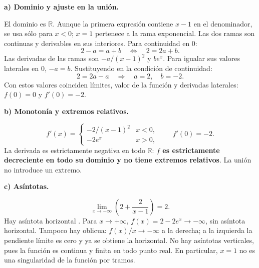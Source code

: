 \textbf{a) Dominio y ajuste en la unión.}\par\nopagebreak[4]
El dominio es $\mathbb R$. Aunque la primera expresión contiene $x-1$ en el denominador, se usa sólo para $x<0$; $x=1$ pertenece a la rama exponencial. Las dos ramas son continuas y derivables en sus interiores.
Para continuidad en $0$:
\[
2-a=a+b\quad\Longleftrightarrow\quad2=2a+b.
\]
Las derivadas de las ramas son $-a/(x-1)^2$ y $be^x$. Para igualar sus valores laterales en $0$, $-a=b$. Sustituyendo en la condición de continuidad:
\[
2=2a-a\quad\Longrightarrow\quad\boxed{a=2,\quad b=-2.}
\]
Con estos valores coinciden límites, valor de la función y derivadas laterales: $f(0)=0$ y $f'(0)=-2$.

\textbf{b) Monotonía y extremos relativos.}\par\nopagebreak[4]
\[
f'(x)=\begin{cases}-2/(x-1)^2&x<0,\\-2e^x&x>0,\end{cases}
\qquad f'(0)=-2.
\]
La derivada es estrictamente negativa en todo $\mathbb R$: \textbf{$f$ es estrictamente decreciente en todo su dominio y no tiene extremos relativos}. La unión no introduce un extremo.

\textbf{c) Asíntotas.}\par\nopagebreak[4]
\[
\lim_{x\to-\infty}\left(2+\frac2{x-1}\right)=2.
\]
Hay asíntota horizontal . Para $x\to+\infty$, $f(x)=2-2e^x\to-\infty$, sin asíntota horizontal. Tampoco hay oblicua: $f(x)/x\to-\infty$ a la derecha; a la izquierda la pendiente límite es cero y ya se obtiene la horizontal.
No hay asíntotas verticales, pues la función es continua y finita en todo punto real. En particular, $x=1$ no es una singularidad de la función por tramos.
